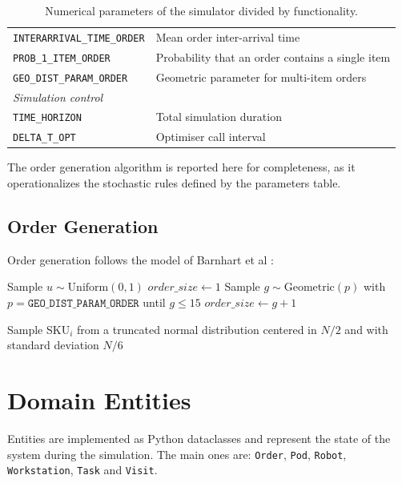 \documentclass[a4paper,10pt]{article}
\begin{document}
\begin{table}[htbp]
\begin{longtable}{p{5cm} p{7.5cm}}
\texttt{INTERARRIVAL\_TIME\_ORDER}   & Mean order inter-arrival time \\
\texttt{PROB\_1\_ITEM\_ORDER}        & Probability that an order contains a single item \\
\texttt{GEO\_DIST\_PARAM\_ORDER}     & Geometric parameter for multi-item orders \\[6pt]
\multicolumn{2}{l}{\textit{Simulation control}} \\[2pt]
\texttt{TIME\_HORIZON}              & Total simulation duration  \\
\texttt{DELTA\_T\_OPT}              & Optimiser call interval \\
\bottomrule
\end{longtable}
\caption{Numerical parameters of the simulator divided by functionality.}
\end{table}

The order generation algorithm is reported here for completeness, as it operationalizes the stochastic rules defined by the parameters table.

\subsection{Order Generation}
Order generation follows the model of Barnhart et al \cite{Barnhart2024}:
\begin{algorithm}
\caption{Order Generation}
\begin{algorithmic}[1]
\State Sample $u \sim \text{Uniform}(0,1)$
    \State $order\_size \gets 1$
\Else
    \State Sample $g \sim \text{Geometric}(p)$ with $p = \texttt{GEO\_DIST\_PARAM\_ORDER}$ until $g \le 15$
    \State $order\_size \gets g + 1$
\EndIf

    \State Sample SKU$_i$ from a truncated normal distribution centered in $N/2$ and with standard deviation $N/6$ 
\EndFor
\end{algorithmic}
\end{algorithm}

\newpage \clearpage
\section{Domain Entities}

Entities are implemented as Python dataclasses and represent the state of the system during the simulation. The main ones are: \texttt{Order}, \texttt{Pod}, \texttt{Robot}, \texttt{Workstation}, \texttt{Task} and \texttt{Visit}.
\end{document}
